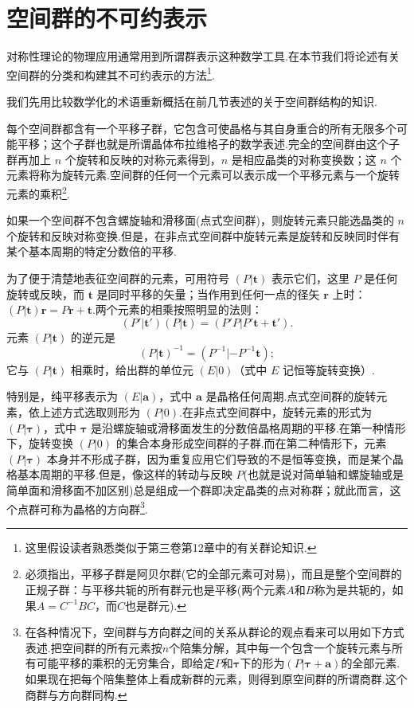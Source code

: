 \section{空间群的不可约表示}

对称性理论的物理应用通常用到所谓群表示这种数学工具.在本节我们将论述有关空间群的分类和构建其不可约表示的方法\footnote{这里假设读者熟悉类似于第三卷第12章中的有关群论知识.}.

我们先用比较数学化的术语重新概括在前几节表述的关于空间群结构的知识.

每个空间群都含有一个平移子群，它包含可使晶格与其自身重合的所有无限多个可能平移；这个子群也就是所谓晶体布拉维格子的数学表述.完全的空间群由这个子群再加上 $n$ 个旋转和反映的对称元素得到，$n$ 是相应晶类的对称变换数；这 $n$ 个元素将称为旋转元素.空间群的任何一个元素可以表示成一个平移元素与一个旋转元素的乘积\footnote{必须指出，平移子群是阿贝尔群(它的全部元素可对易)，而且是整个空间群的正规子群：与平移共轭的所有群元也是平移(两个元素$A$和$B$称为是共轭的，如果$A=C^{-1}BC$，而$C$也是群元).}.

如果一个空间群不包含螺旋轴和滑移面(点式空间群)，则旋转元素只能选晶类的 $n$ 个旋转和反映对称变换.但是，在非点式空间群中旋转元素是旋转和反映同时伴有某个基本周期的特定分数倍的平移.

为了便于清楚地表征空间群的元素，可用符号 $(P|\boldsymbol{t})$ 表示它们，这里 $P$ 是任何旋转或反映，而 $\boldsymbol{t}$ 是同时平移的矢量；当作用到任何一点的径矢 $\boldsymbol{r}$ 上时：$(P|\boldsymbol{t})\boldsymbol{r}=P\boldsymbol{r}+\boldsymbol{t}$.两个元素的相乘按照明显的法则：
\begin{equation}
  (P'|\boldsymbol{t}')(P|\boldsymbol{t})=(P'P|P'\boldsymbol{t}+\boldsymbol{t}').
\end{equation}
元素 $(P|\boldsymbol{t})$ 的逆元是
\begin{equation}
  (P|\boldsymbol{t})^{-1}=(P^{-1}|-P^{-1}\boldsymbol{t});
\end{equation}
它与 $(P|\boldsymbol{t})$ 相乘时，给出群的单位元 $(E|0)$（式中 $E$ 记恒等旋转变换）.

特别是，纯平移表示为 $(E|\boldsymbol{a})$，式中 $\boldsymbol{a}$ 是晶格任何周期.点式空间群的旋转元素，依上述方式选取则形为 $(P|0)$.在非点式空间群中，旋转元素的形式为 $(P|\boldsymbol{\tau})$，式中 $\boldsymbol{\tau}$ 是沿螺旋轴或滑移面发生的分数倍晶格周期的平移.在第一种情形下，旋转变换 $(P|0)$ 的集合本身形成空间群的子群.而在第二种情形下，元素 $(P|\boldsymbol{\tau})$ 本身并不形成子群，因为重复应用它们导致的不是恒等变换，而是某个晶格基本周期的平移.但是，像这样的转动与反映 $P$(也就是说对简单轴和螺旋轴或是简单面和滑移面不加区别)总是组成一个群即决定晶类的点对称群；就此而言，这个点群可称为晶格的方向群\footnote{在各种情况下，空间群与方向群之间的关系从群论的观点看来可以用如下方式表述.把空间群的所有元素按$n$个陪集分解，其中每一个包含一个旋转元素与所有可能平移的乘积的无穷集合，即给定$P$和$\boldsymbol{\tau}$下的形为$(P|\boldsymbol{\tau}+\boldsymbol{a})$的全部元素.如果现在把每个陪集整体上看成新群的元素，则得到原空间群的所谓商群.这个商群与方向群同构.}.

